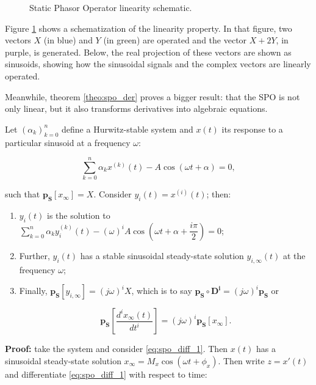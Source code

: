 \begin{figure}[htb]
	\caption{Static Phasor Operator linearity schematic.}
	\label{fig:spo_linearity}
\end{figure} %

	Figure \ref{fig:spo_linearity} shows a schematization of the linearity property. In that figure, two vectors $X$ (in blue) and $Y$ (in green) are operated and the vector $X + 2Y$, in purple, is generated. Below, the real projection of these vectors are shown as sinusoids, showing how the sinusoidal signals and the complex vectors are linearly operated.

	Meanwhile, theorem \ref{theo:spo_der} proves a bigger result: that the SPO is not only linear, but it also transforms derivatives into algebraic equations.

\begin{theorem}\label{theo:spo_der} %
	Let $\left(\alpha_k\right)_{k=0}^n$ define a Hurwitz-stable system and $x(t)$ its response to a particular sinusoid at a frequency $\omega$:

\begin{equation} \sum\limits_{k=0}^n \alpha_k x^{(k)}(t) - A\cos\left(\omega t + \alpha\right) = 0 , \label{eq:spo_diff_1}\end{equation}

	\noindent such that $\mathbf{p_S}\left[x_\infty\right] = X$. Consider $y_i(t) = x^{(i)}(t)$; then:

\begin{enumerate}
	\item $y_i(t)$ is the solution to $\sum\limits_{k=0}^n \alpha_k y_i^{(k)}(t) - \left(\omega\right)^i A\cos\left(\omega t + \alpha + \dfrac{i\pi}{2}\right) = 0$;

	\item Further, $y_i(t)$ has a stable sinusoidal steady-state solution $y_{i,\infty}(t)$ at the frequency $\omega$;

	\item Finally, $\mathbf{p_S}\left[y_{i,\infty}\right] = \left(j\omega\right)^i X$, which is to say $\mathbf{p_S} \circ \mathbf{D^i} = \left(j\omega\right)^i \mathbf{p_S}$ or

\begin{equation} \mathbf{p_S}\left[ \dfrac{d^ix_\infty(t)}{dt^i}\right] = \left(j\omega\right)^i \mathbf{p_S}\left[ x_\infty \right] .\end{equation}
\end{enumerate}
\end{theorem} 
\noindent\textbf{Proof:} take the system and consider \eqref{eq:spo_diff_1}. Then $x(t)$ has a sinusoidal steady-state solution $x_\infty = M_x \cos\left(\omega t + \phi_x\right)$. Then write $z = x'(t)$ and differentiate \eqref{eq:spo_diff_1} with respect to time:

